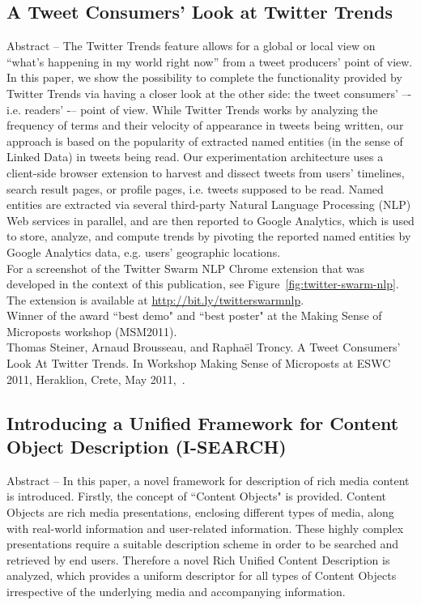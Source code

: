 \documentclass[12pt]{article}
\begin{document}
\subsection{A Tweet Consumers’ Look at Twitter Trends} 
Abstract -- The Twitter Trends feature allows for a global or local view on ``what’s happening in my world right now” from a tweet producers’ point of view. In this paper, we show the possibility to complete the functionality provided by Twitter Trends via having a closer look at the other side: the tweet consumers’ –- i.e. readers’ -– point of view. While Twitter Trends works by analyzing the frequency of terms and their velocity of appearance in tweets being written, our approach is based on the popularity of extracted named entities (in the sense of Linked Data) in tweets being read. Our experimentation architecture uses a client-side browser extension to harvest and dissect tweets from users’ timelines, search result pages, or profile pages, i.e. tweets supposed to be read. Named entities are extracted via several third-party Natural Language Processing (NLP) Web services in parallel, and are then reported to Google Analytics, which is used to store, analyze, and compute trends by pivoting the reported named entities by Google Analytics data, e.g. users’ geographic locations.\\

\noindent For a screenshot of the Twitter Swarm NLP Chrome extension that was developed in the context of this publication, see Figure~\ref{fig:twitter-swarm-nlp}. The extension is available at \url{http://bit.ly/twitterswarmnlp}.\\

\noindent Winner of the award ``best demo" and ``best poster" at the Making Sense of Microposts workshop (MSM2011).\\

\noindent Thomas Steiner, Arnaud Brousseau, and Rapha{\"e}l Troncy. A Tweet Consumers' Look At Twitter Trends. In Workshop Making Sense of Microposts at ESWC 2011, Heraklion, Crete, May 2011,~\cite{twittertrends}.\\

\subsection{Introducing a Unified Framework for Content Object Description (I-SEARCH)}
Abstract -- In this paper, a novel framework for description of rich media content is introduced. Firstly, the concept of ``Content Objects" is provided. Content Objects are rich media presentations, enclosing different types of media, along with real-world information and user-related information. These highly complex presentations require a suitable description scheme in order to be searched and retrieved by end users. Therefore a novel Rich Unified Content Description is analyzed, which provides a uniform descriptor for all types of Content Objects irrespective of the underlying media and accompanying information.\\
\end{document}
